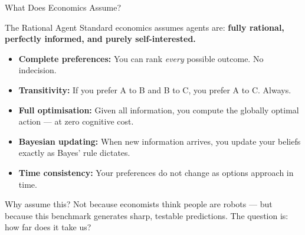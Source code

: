 \documentclass[aspectratio=169]{beamer}
\begin{document}
\begin{frame}{What Does Economics Assume?}
\begin{block}{The Rational Agent}
Standard economics assumes agents are: \textbf{fully rational, perfectly informed, and purely self-interested.}
\end{block}
\begin{itemize}[<+->]
  \item \textbf{Complete preferences:} You can rank \emph{every} possible outcome. No indecision.
  \item \textbf{Transitivity:} If you prefer A to B and B to C, you prefer A to C. Always.
  \item \textbf{Full optimisation:} Given all information, you compute the globally optimal action --- at zero cognitive cost.
  \item \textbf{Bayesian updating:} When new information arrives, you update your beliefs exactly as Bayes' rule dictates.
  \item \textbf{Time consistency:} Your preferences do not change as options approach in time.
\end{itemize}
\pause
\begin{exampleblock}{Why assume this?}
Not because economists think people are robots --- but because this benchmark generates sharp, testable predictions. The question is: \alert{how far does it take us?}
\end{exampleblock}
\end{frame}
\end{document}
